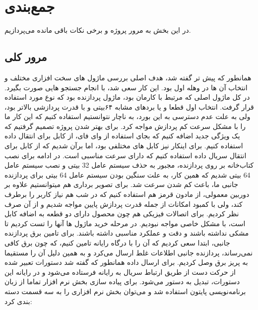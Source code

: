 \documentclass{article}
\begin{document}
\section{جمع‌بندی}
در این بخش به مرور پروژه و برخی نکات باقی مانده می‌پردازیم.

\subsection{مرور کلی}
همانطور که پیش تر گفته شد، هدف اصلی بررسی ماژول های سخت افزاری مختلف و انتخاب آن ها در وهله اول بود. این کار سعی شد، با انجام جستجو هایی صورت بگیرد. در کل ماژول اصلی که مرتبط با کارمان بود، ماژول پردازنده بود که نوع  مورد استفاده قرار گرفت. انتخاب اول قطعا  و یا برد‌های مشابه ۶۴بیتی و با قدرت پردازشی بالاتر بود، ولی به علت عدم دسترسی به این بورد، به ناچار نتوانستیم استفاده کنیم که این کار ما را با مشکل سرعت کم پردازش مواجه کرد. برای بهتر شدن پروژه تصمیم گرفتیم که یک ويژگی جدید اضافه کنیم که بجای استفاده از وای فای، از کابل برای انتقال داده استفاده کنیم. برای اینکار نیز کابل های مختلفی بود، اما برآن شدیم که از کابل  برای انتقال سریال داده استفاده کنیم که دارای سرعت مناسبی است. در ادامه برای نصب کتاب‌خانه  بر روی پردازنده، مجبور به حذف سیستم عامل 32 بیتی  و نصب سیستم عامل 64 بیتی شدیم که همین کار، به علت سنگین بودن سیستم عامل 64 بیتی برای پردازنده جانبی ما، باعث کم شدن سرعت شد. برای تصویر برداری هم میتوانستیم علاوه بر دوربین معمولی، از مادون قرمز هم استفاده کنیم که در شب هم نیاز کاربر را برطرف کند، ولی با کمبود امکانات از جمله قدرت پردازش پایین مواجه شدیم و از آن صرف نظر کردیم. برای اتصالات فیزیکی هم چون محصول دارای دو قطعه به اضافه کابل است، با مشکل خاصی مواجه نبودیم. در مرحله خرید ماژول ها آنها را تست کردیم تا مشکی نداشته باشند و دقت و عملکرد مناسبی داشته باشند. برای تامین برق پردازنده جانبی، ابتدا سعی کردیم که آن را با درگاه  رایانه تامین کنیم، که چون برق کافی نمی‌رساند، پردازنده جانبی اطلاعات غلط ارسال می‌کرد و به همین دلیل آن را مستقیما به پریز برق وصل کردیم. برای ارسال داده همانطور که گفته شد دستورات تعبیر شده از حرکت دست از طریق ارتباط سریال به رایانه فرستاده می‌شود و در رایانه این دستورات، تبدیل به دستور  می‌شود. برای پیاده سازی بخش نرم افزار تماما از زبان برنامه‌نویسی پایتون استفاده شد و می‌توان بخش نرم افزاری را به سه قسمت دسته بندی کرد:
\end{document}
